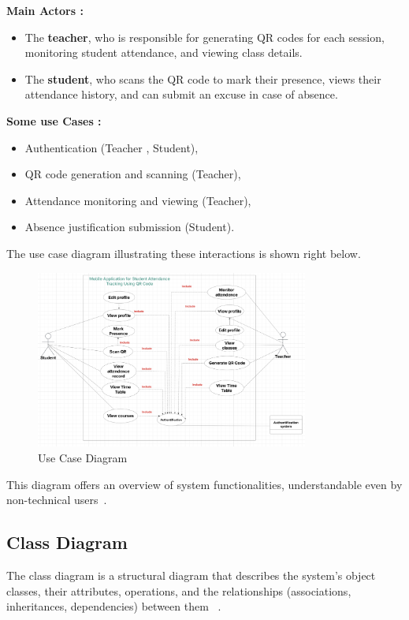 \documentclass[12pt,a4paper]{report}
\begin{document}
\textbf{Main Actors :}
\begin{itemize}
\item The \textbf{teacher}, who is responsible for generating QR codes for each session, monitoring student attendance, and viewing class details.
\item The \textbf{student}, who scans the QR code to mark their presence, views their attendance history, and can submit an excuse in case of absence.
\end{itemize}

\textbf{ Some use Cases :}
\begin{itemize}
\item Authentication (Teacher , Student),
\item QR code generation and scanning (Teacher),
\item Attendance monitoring and viewing (Teacher),
\item Absence justification submission (Student).
\end{itemize}

The use case diagram illustrating these interactions is shown right below.
\begin{figure}[htbp]
    \centering
    \includegraphics[width=0.8\textwidth]{images/morsli/use_case2.png}
    \caption{Use Case Diagram}
    \label{fig:attendance-system}
\end{figure}

\vspace{9,5cm}
\newline
This diagram offers an overview of system functionalities, understandable even by non-technical users~\cite{fowler2004}.

\subsection{Class Diagram}
The class diagram is a structural diagram that describes the system's object classes, their attributes, operations, and the relationships (associations, inheritances, dependencies) between them ~\cite{fowler2004}.
\end{document}
